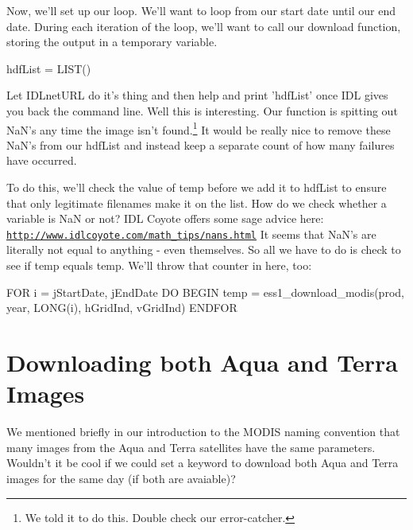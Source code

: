 \documentclass{book}
\newcounter{highlight}[page]
\newcommand{\tikzhighlightanchor}[1]{\ensuremath{\vcenter{\hbox{\tikz[remember picture, overlay]{\coordinate (#1 highlight \arabic{highlight});}}}}}
\newcommand{\bh}[0]{\stepcounter{highlight}\tikzhighlightanchor{begin}}
\newcommand{\eh}[0]{\tikzhighlightanchor{end}}
\theoremstyle{aside_style}
\newcommand{\link}[1]{\href{#1}{\nolinkurl{#1}}} %
\begin{document}
Now, we'll set up our loop. We'll want to loop from our start date until our end date.
During each iteration of the loop, we'll want to call our download function, storing the output in a temporary variable.

\begin{idl}

hdfList = LIST()

\end{idl}

Let IDLnetURL do it's thing and then help and print 'hdfList' once IDL gives you back the command line.
Well this is interesting. Our function is spitting out NaN's any time the image isn't found.\footnote{We told it to do this. Double check our error-catcher.}
It would be really nice to remove these NaN's from our hdfList and instead keep a separate count of how many failures have occurred.

To do this, we'll check the value of temp before we add it to hdfList to ensure that only legitimate filenames make it on the list.
How do we check whether a variable is NaN or not? IDL Coyote offers some sage advice here: \link{http://www.idlcoyote.com/math_tips/nans.html} 
It seems that NaN's are literally not equal to anything - even themselves. So all we have to do is check to see if temp equals temp.
We'll throw that counter in here, too:

\begin{idl}

FOR i = jStartDate, jEndDate DO BEGIN
    temp = ess1_download_modis(prod, year, LONG(i), hGridInd, vGridInd)
ENDFOR
\end{idl}


\section{Downloading both Aqua and Terra Images}

We mentioned briefly in our introduction to the MODIS naming convention that many images from the Aqua and Terra satellites have the same parameters.
Wouldn't it be cool if we could set a keyword to download both Aqua and Terra images for the same day (if both are avaiable)?
\end{document}
